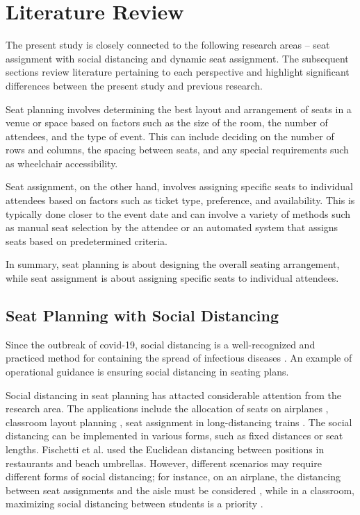 \section{Literature Review}

The present study is closely connected to the following research areas -- seat assignment with social distancing and dynamic seat assignment. The subsequent sections review literature pertaining to each perspective and highlight significant differences between the present study and previous research.


Seat planning involves determining the best layout and arrangement of seats in a venue or space based on factors such as the size of the room, the number of attendees, and the type of event. This can include deciding on the number of rows and columns, the spacing between seats, and any special requirements such as wheelchair accessibility.

Seat assignment, on the other hand, involves assigning specific seats to individual attendees based on factors such as ticket type, preference, and availability. This is typically done closer to the event date and can involve a variety of methods such as manual seat selection by the attendee or an automated system that assigns seats based on predetermined criteria.

In summary, seat planning is about designing the overall seating arrangement, while seat assignment is about assigning specific seats to individual attendees.


\subsection{Seat Planning with Social Distancing}
Since the outbreak of covid-19, social distancing is a well-recognized and practiced method for containing the spread of infectious diseases \cite{moosa2020effectiveness}. An example of operational guidance is ensuring social distancing in seating plans.

Social distancing in seat planning has attacted considerable attention from the research area. The applications include the allocation of seats on airplanes \cite{ghorbani2020model}, classroom layout planning \cite{bortolete2022support}, seat assignment in long-distancing trains \cite{haque2022optimization}. The social distancing can be implemented in various forms, such as fixed distances or seat lengths. Fischetti et al.\cite{fischetti2021safe} used the Euclidean distancing between positions in restaurants and beach umbrellas. However, different scenarios may require different forms of social distancing; for instance, on an airplane, the distancing between seat assignments and the aisle must be considered \cite{salari2022social}, while in a classroom, maximizing social distancing between students is a priority \cite{bortolete2022support}.


